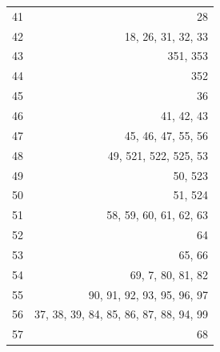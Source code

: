 \documentclass{article}
\begin{document}
\begin{center}
\begin{longtable}{| l | r |}
    41 & 28 \\
    42 & 18, 26, 31, 32, 33 \\
    43 & 351, 353 \\
    44 & 352 \\
    45 & 36 \\
    46 & 41, 42, 43 \\
    47 & 45, 46, 47, 55, 56 \\
    48 & 49, 521, 522, 525, 53 \\
    49 & 50, 523 \\
    50 & 51, 524 \\
    51 & 58, 59, 60, 61, 62, 63 \\
    52 & 64 \\
    53 & 65, 66 \\
    54 & 69, 7, 80, 81, 82 \\
    55 & 90, 91, 92, 93, 95, 96, 97 \\
    56 & 37, 38, 39, 84, 85, 86, 87, 88, 94, 99 \\
    57 & 68 \\
\hline
\end{longtable}
\end{center}
\end{document}
